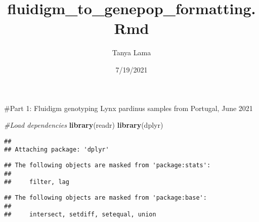 \documentclass[
]{article}
\title{fluidigm\_to\_genepop\_formatting.Rmd}
\author{Tanya Lama}
\date{7/19/2021}
\newenvironment{Shaded}{\begin{snugshade}}{\end{snugshade}}
\newcommand{\CommentTok}[1]{\textcolor[rgb]{0.56,0.35,0.01}{\textit{#1}}}
\newcommand{\KeywordTok}[1]{\textcolor[rgb]{0.13,0.29,0.53}{\textbf{#1}}}
\newcommand{\NormalTok}[1]{#1}
\begin{document}
\maketitle

\#Part 1: Fluidigm genotyping Lynx pardinus samples from Portugal, June
2021

\begin{Shaded}
\begin{Highlighting}[]
\CommentTok{#Load dependencies}
\KeywordTok{library}\NormalTok{(readr)}
\KeywordTok{library}\NormalTok{(dplyr)}
\end{Highlighting}
\end{Shaded}

\begin{verbatim}
## 
## Attaching package: 'dplyr'
\end{verbatim}

\begin{verbatim}
## The following objects are masked from 'package:stats':
## 
##     filter, lag
\end{verbatim}

\begin{verbatim}
## The following objects are masked from 'package:base':
## 
##     intersect, setdiff, setequal, union
\end{verbatim}
\end{document}
